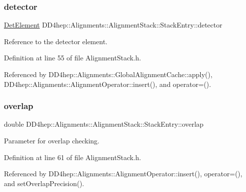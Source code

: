 \subsubsection{\texorpdfstring{detector}{detector}}
{\footnotesize\ttfamily \hyperlink{class_d_d4hep_1_1_geometry_1_1_det_element}{Det\+Element} D\+D4hep\+::\+Alignments\+::\+Alignment\+Stack\+::\+Stack\+Entry\+::detector}



Reference to the detector element. 



Definition at line 55 of file Alignment\+Stack.\+h.



Referenced by D\+D4hep\+::\+Alignments\+::\+Global\+Alignment\+Cache\+::apply(), D\+D4hep\+::\+Alignments\+::\+Alignment\+Operator\+::insert(), and operator=().

\hypertarget{struct_d_d4hep_1_1_alignments_1_1_alignment_stack_1_1_stack_entry_ad911a7daa4d606e7c8454b005064b4e9}{}\label{struct_d_d4hep_1_1_alignments_1_1_alignment_stack_1_1_stack_entry_ad911a7daa4d606e7c8454b005064b4e9} 
\subsubsection{\texorpdfstring{overlap}{overlap}}
{\footnotesize\ttfamily double D\+D4hep\+::\+Alignments\+::\+Alignment\+Stack\+::\+Stack\+Entry\+::overlap}



Parameter for overlap checking. 



Definition at line 61 of file Alignment\+Stack.\+h.



Referenced by D\+D4hep\+::\+Alignments\+::\+Alignment\+Operator\+::insert(), operator=(), and set\+Overlap\+Precision().

\hypertarget{struct_d_d4hep_1_1_alignments_1_1_alignment_stack_1_1_stack_entry_a821c8882427c693062524b6573baa92c}{}\label{struct_d_d4hep_1_1_alignments_1_1_alignment_stack_1_1_stack_entry_a821c8882427c693062524b6573baa92c} 
